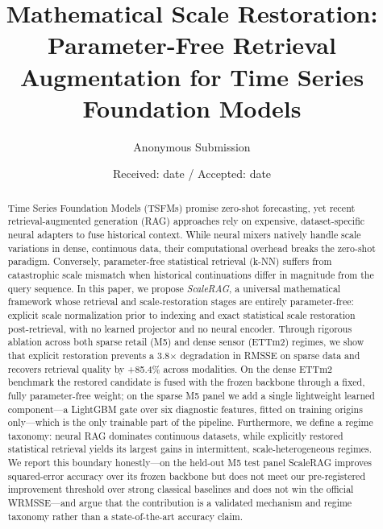 \documentclass[twocolumn]{svjour3}          %
\begin{document}
\title{Mathematical Scale Restoration: Parameter-Free Retrieval Augmentation for Time Series Foundation Models}

\author{Anonymous Submission}

\institute{}

%

\date{Received: date / Accepted: date}

\maketitle

\begin{abstract}
Time Series Foundation Models (TSFMs) promise zero-shot forecasting, yet recent retrieval-augmented generation (RAG) approaches rely on expensive, dataset-specific neural adapters to fuse historical context. While neural mixers natively handle scale variations in dense, continuous data, their computational overhead breaks the zero-shot paradigm. Conversely, parameter-free statistical retrieval (k-NN) suffers from catastrophic scale mismatch when historical continuations differ in magnitude from the query sequence.
In this paper, we propose \textit{ScaleRAG}, a universal mathematical framework whose retrieval and scale-restoration stages are entirely parameter-free: explicit scale normalization prior to indexing and exact statistical scale restoration post-retrieval, with no learned projector and no neural encoder. Through rigorous ablation across both sparse retail (M5) and dense sensor (ETTm2) regimes, we show that explicit restoration prevents a 3.8$\times$ degradation in RMSSE on sparse data and recovers retrieval quality by +85.4\% across modalities. On the dense ETTm2 benchmark the restored candidate is fused with the frozen backbone through a fixed, fully parameter-free weight; on the sparse M5 panel we add a single lightweight learned component---a LightGBM gate over six diagnostic features, fitted on training origins only---which is the only trainable part of the pipeline. Furthermore, we define a regime taxonomy: neural RAG dominates continuous datasets, while explicitly restored statistical retrieval yields its largest gains in intermittent, scale-heterogeneous regimes. We report this boundary honestly---on the held-out M5 test panel ScaleRAG improves squared-error accuracy over its frozen backbone but does not meet our pre-registered improvement threshold over strong classical baselines and does not win the official WRMSSE---and argue that the contribution is a validated mechanism and regime taxonomy rather than a state-of-the-art accuracy claim.
\end{abstract}
\end{document}
